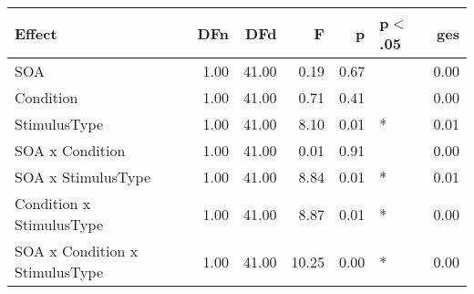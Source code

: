 \begin{table}[ht]
\centering
\begin{tabulary}{\textwidth}{lrrrrlr}
  \hline
Effect & DFn & DFd & F & p & p$<$.05 & ges \\ 
  \hline
SOA & 1.00 & 41.00 & 0.19 & 0.67 &  & 0.00 \\ 
  Condition & 1.00 & 41.00 & 0.71 & 0.41 &  & 0.00 \\ 
  StimulusType & 1.00 & 41.00 & 8.10 & 0.01 & * & 0.01 \\ 
  SOA x Condition & 1.00 & 41.00 & 0.01 & 0.91 &  & 0.00 \\ 
  SOA x StimulusType & 1.00 & 41.00 & 8.84 & 0.01 & * & 0.01 \\ 
  Condition x StimulusType & 1.00 & 41.00 & 8.87 & 0.01 & * & 0.00 \\ 
  SOA x Condition x StimulusType & 1.00 & 41.00 & 10.25 & 0.00 & * & 0.00 \\ 
   \hline
\end{tabulary}
\end{table}
